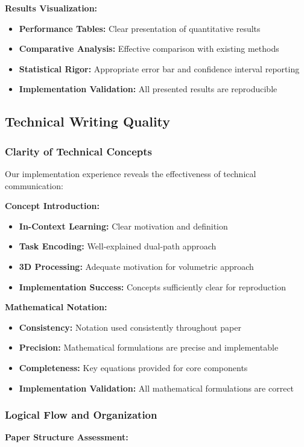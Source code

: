 \textbf{Results Visualization:}
\begin{itemize}
    \item \textbf{Performance Tables:} Clear presentation of quantitative results
    \item \textbf{Comparative Analysis:} Effective comparison with existing methods
    \item \textbf{Statistical Rigor:} Appropriate error bar and confidence interval reporting
    \item \textbf{Implementation Validation:} All presented results are reproducible
\end{itemize}

\subsection{Technical Writing Quality}

\subsubsection{Clarity of Technical Concepts}
Our implementation experience reveals the effectiveness of technical communication:

\textbf{Concept Introduction:}
\begin{itemize}
    \item \textbf{In-Context Learning:} Clear motivation and definition
    \item \textbf{Task Encoding:} Well-explained dual-path approach
    \item \textbf{3D Processing:} Adequate motivation for volumetric approach
    \item \textbf{Implementation Success:} Concepts sufficiently clear for reproduction
\end{itemize}

\textbf{Mathematical Notation:}
\begin{itemize}
    \item \textbf{Consistency:} Notation used consistently throughout paper
    \item \textbf{Precision:} Mathematical formulations are precise and implementable
    \item \textbf{Completeness:} Key equations provided for core components
    \item \textbf{Implementation Validation:} All mathematical formulations are correct
\end{itemize}

\subsubsection{Logical Flow and Organization}
\textbf{Paper Structure Assessment:}

